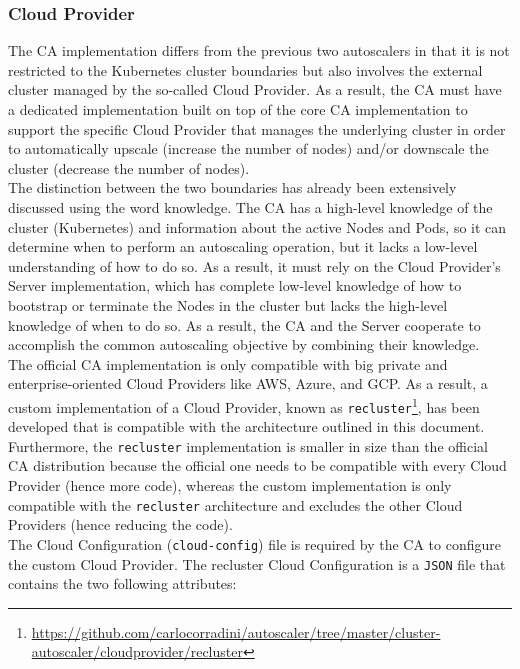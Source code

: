 \subsubsection{Cloud Provider}
\label{subsubsec:implementation_autoscaling_cluster_autoscaler_cloud_provider}

The CA implementation differs from the previous two autoscalers in that it is not
restricted to the Kubernetes cluster boundaries but also involves the external cluster
managed by the so-called Cloud Provider. As a result, the CA must have a dedicated
implementation built on top of the core CA implementation to support the specific
Cloud Provider that manages the underlying cluster in order to automatically upscale
(increase the number of nodes) and/or downscale the cluster (decrease the number
of nodes). \\ %
The distinction between the two boundaries has already been extensively discussed
using the word knowledge. The CA has a high-level knowledge of the cluster (Kubernetes)
and information about the active Nodes and Pods, so it can determine when to perform
an autoscaling operation, but it lacks a low-level understanding of how to do so.
As a result, it must rely on the Cloud Provider's Server implementation, which has
complete low-level knowledge of how to bootstrap or terminate the Nodes in the cluster
but lacks the high-level knowledge of when to do so. As a result, the CA and the
Server cooperate to accomplish the common autoscaling objective by combining their
knowledge. \\ %
The official CA implementation is only compatible with big private and enterprise-oriented
Cloud Providers like AWS, Azure, and GCP. As a result, a custom implementation of
a Cloud Provider, known as \texttt{recluster}\footnote{\url{https://github.com/carlocorradini/autoscaler/tree/master/cluster-autoscaler/cloudprovider/recluster}},
has been developed that is compatible with the architecture outlined in this
document. Furthermore, the \texttt{recluster} implementation is smaller in size than
the official CA distribution because the official one needs to be compatible with
every Cloud Provider (hence more code), whereas the custom implementation is
only compatible with the \texttt{recluster} architecture and excludes the other Cloud
Providers (hence reducing the code). \\ %
The Cloud Configuration (\texttt{cloud-config}) file is required by the CA to
configure the custom Cloud Provider. The recluster Cloud Configuration is a \texttt{JSON}
file that contains the two following attributes:
